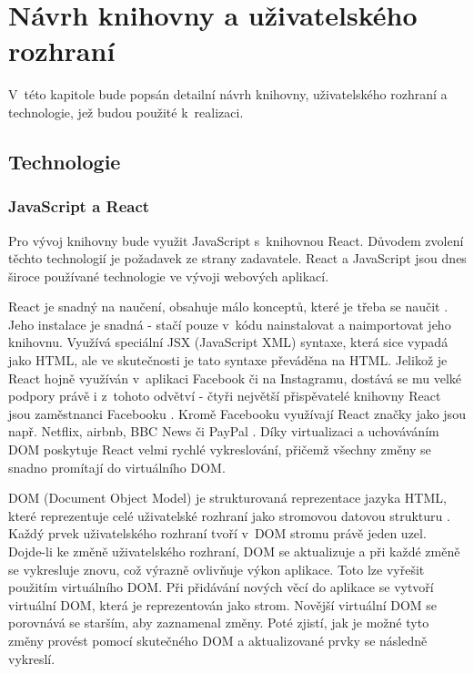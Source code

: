 \documentclass[czech, bc, kiv, he, iso690numb]{fasthesis}
\begin{document}
%
%
%
%
\chapter{Návrh knihovny a uživatelského rozhraní}

V~této kapitole bude popsán detailní návrh knihovny, uživatelského rozhraní a technologie, jež budou použité k~realizaci. 

\section{Technologie}

\subsection{JavaScript a React}
Pro vývoj knihovny bude využit JavaScript s~knihovnou React. Důvodem zvolení těchto technologií je požadavek ze strany zadavatele. React a JavaScript jsou dnes
široce používané technologie ve vývoji webových aplikací. 

React je snadný na naučení, obsahuje málo konceptů, které je třeba se naučit \cite{whyUsingReact}. Jeho instalace je snadná -
stačí pouze v~kódu nainstalovat a naimportovat jeho knihovnu. Využívá speciální JSX (JavaScript XML) syntaxe, která sice vypadá jako HTML, ale ve skutečnosti je tato syntaxe převáděna na HTML. Jelikož je React hojně využíván
v~aplikaci Facebook či na Instagramu, dostává se mu velké podpory právě i z~tohoto odvětví - čtyři největší přispěvatelé knihovny React jsou zaměstnanci Facebooku \cite{whyUsingReact}. Kromě 
Facebooku využívají React značky jako jsou např. Netflix, airbnb, BBC News či PayPal \cite{whyUsingReact2}. Díky virtualizaci a uchováváním DOM poskytuje React
velmi rychlé vykreslování, přičemž všechny změny se snadno promítají do virtuálního DOM. 

DOM (Document Object Model) je strukturovaná reprezentace jazyka HTML, které reprezentuje celé uživatelské rozhraní jako stromovou datovou strukturu \cite{whatIsDOM}. Každý prvek uživatelského
rozhraní tvoří v~DOM stromu právě jeden uzel. Dojde-li ke změně uživatelského rozhraní, DOM se aktualizuje 	a při každé změně se vykresluje znovu, což výrazně ovlivňuje výkon aplikace. 
Toto lze vyřešit použitím virtuálního DOM. Při přidávání nových věcí do aplikace se vytvoří virtuální DOM, která je reprezentován jako strom. Novější virtuální DOM se porovnává se starším, aby
zaznamenal změny. Poté zjistí, jak je možné tyto změny provést pomocí skutečného DOM a aktualizované prvky se následně vykreslí.
\end{document}
